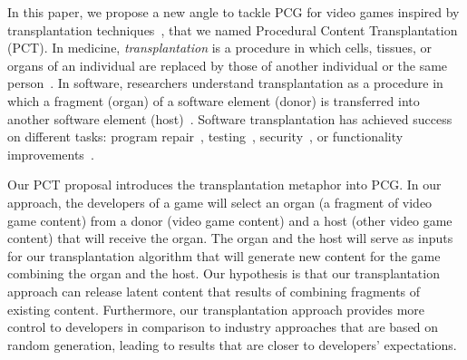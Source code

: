In this paper, we propose a new angle to tackle PCG for video games inspired by transplantation techniques~\cite{barr2015automated}, that we named Procedural Content Transplantation (PCT). In medicine, \textit{transplantation} is a procedure in which cells, tissues, or organs of an individual are replaced by those of another individual or the same person~\cite{FARSHBAFNADI2023599}. In software, researchers understand transplantation as a procedure in which a fragment (organ) of a software element (donor) is transferred into another software element (host)~\cite{barr2015automated}. Software transplantation has achieved success on different tasks: program repair~\cite{weimer2009automatically,sidiroglou2014automatic}, testing~\cite{zhang2017automated}, security~\cite{yang2017malware}, or functionality improvements~\cite{sidiroglou2017codecarboncopy}.

Our PCT proposal introduces the transplantation metaphor into PCG. In our approach, the developers of a game will select an organ (a fragment of video game content) from a donor (video game content) and a host (other video game content) that will receive the organ. The organ and the host will serve as inputs for our transplantation algorithm that will generate new content for the game combining the organ and the host. Our hypothesis is that our transplantation approach can release latent content that results of combining fragments of existing content. Furthermore, our transplantation approach provides more control to developers in comparison to industry approaches that are based on random generation, leading to results that are closer to developers' expectations.


